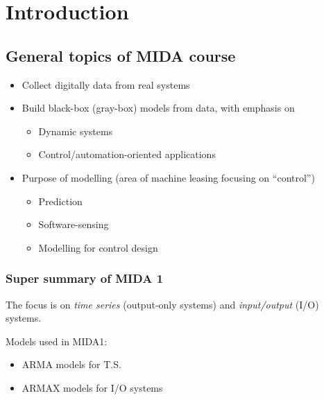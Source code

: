 \chapter{Introduction}

\section{General topics of MIDA course}

\begin{itemize}
    \item Collect digitally data from real systems
    \item Build black-box (gray-box) models from data, with emphasis on
    \begin{itemize}
        \item Dynamic systems
        \item Control/automation-oriented applications
    \end{itemize}
    \item Purpose of modelling (area of machine leasing focusing on ``control'')
    \begin{itemize}
        \item Prediction
        \item Software-sensing
        \item Modelling for control design
    \end{itemize}
\end{itemize}

\subsection{Super summary of MIDA 1}
The focus is on \emph{time series} (output-only systems) and \emph{input/output} (I/O) systems.

Models used in MIDA1:
\begin{itemize}
    \item ARMA models for T.S.
    \item ARMAX models for I/O systems
\end{itemize}

